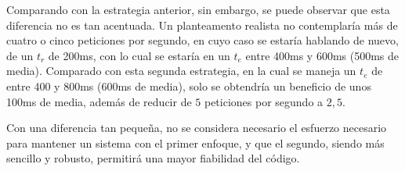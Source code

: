 Comparando con la estrategia anterior, sin embargo, se puede observar que esta diferencia no es tan acentuada. Un planteamento realista no contemplaría más de cuatro o cinco peticiones por segundo, en cuyo caso se estaría hablando de nuevo, de un $t_r$ de 200ms, con lo cual se estaría en un $t_e$ entre 400ms y 600ms (500ms de media). Comparado con esta segunda estrategia, en la cual se maneja un $t_e$ de entre 400 y 800ms (600ms de media), solo se obtendría un beneficio de unos 100ms de media, además de reducir de $5$ peticiones por segundo a $2,5$.

Con una diferencia tan pequeña, no se considera necesario el esfuerzo necesario para mantener un sistema con el primer enfoque, y que el segundo, siendo más sencillo y robusto, permitirá una mayor fiabilidad del código.




